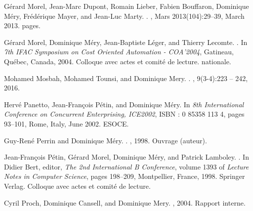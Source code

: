 \documentclass[ 12pt]{article}
\begin{document}
\begin{thebibliography}{100}
G{\'e}rard Morel, Jean-Marc Dupont, Romain Lieber, Fabien Bouffaron, Dominique
  M{\'e}ry, Fr{\'e}d{\'e}rique Mayer, and Jean-Luc Marty.
.
, Mars 2013(104):29--39, March 2013.
 pages.

G{\'e}rard Morel, Dominique M{\'e}ry, Jean-Baptiste L{\'e}ger, and Thierry
  Lecomte.
.
\newblock In {\em {7th IFAC Symposium on Cost Oriented Automation - COA'2004}},
  Gatineau, Qu{\'e}bec, Canada, 2004.
\newblock Colloque avec actes et comit{\'e} de lecture. nationale.

Mohamed Mosbah, Mohamed Tounsi, and Dominique Mery.
.
, 9(3-4):223 -- 242, 2016.

Herv{\'e} Panetto, Jean-Fran{\c c}ois P{\'e}tin, and Dominique M{\'e}ry.
\newblock In {\em {8th International Conference on Concurrent Enterprising,
  ICE2002}}, ISBN : 0 85358 113 4, pages 93--101, Rome, Italy, June 2002.
  {ESOCE}.

Guy-Ren{\'e} Perrin and Dominique M{\'e}ry.
.
, 1998.
\newblock Ouvrage (auteur).

Jean-Fran{\c c}ois P{\'e}tin, G{\'e}rard Morel, Dominique M{\'e}ry, and Patrick
  Lamboley.
.
\newblock In Didier Bert, editor, {\em {The 2nd International B Conference}},
  volume 1393 of {\em Lecture Notes in Computer Science}, pages 198--209,
  Montpellier, France, 1998. {Springer Verlag}.
\newblock Colloque avec actes et comit{\'e} de lecture.

Cyril Proch, Dominique Cansell, and Dominique Mery.
, 2004.
\newblock Rapport interne.


\end{thebibliography}
\end{document}

